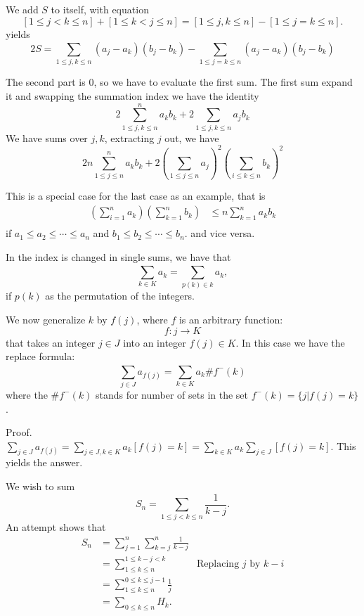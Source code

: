 We add $S$ to itself, with equation
\[
    [1\leq j<k\leq n]+[1\leq k<j\leq n]=[1\leq j,k\leq n]-[1\leq j=k\leq n].
\]
yields 
\[
    2S=\sum_{1\leq j,k\leq n}^{}(a_j-a_k)(b_j-b_k) - \sum_{1\leq j=k\leq n}^{} (a_j-a_k)(b_j-b_k)
\]

The second part is 0, so we have to evaluate the first sum.
The first sum expand it and swapping the summation index
we have the identity 
\[
    2 \sum_{1\leq j,k\leq n}^{n}a_kb_k + 2 \sum_{1\leq j,k\leq n}^{} a_jb_k
\]
We have sums over $j,k$, extracting $j$ out, we have 
\[
    2n \sum_{1\leq j\leq n}^{n}a_kb_k + 2 \left(\sum_{1\leq j\leq n}^{} a_j  \right)^2 \left( \sum_{i\leq k\leq n}^{} b_k\right)^2
\]

 This is a special case for the 
last case as an example, that is 
\begin{align*}
    \left( \sum_{i=1}^{n} a_k \right) \left( \sum_{k=1}^{n} b_k \right) 
    &\leq n \sum_{k=1}^{n} a_k b_k \\
\end{align*}
if $a_1\leq a_2\leq \cdots\leq a_n$ and $b_1\leq b_2\leq \cdots\leq b_n$. 
and vice versa. 

 In the index is changed in 
single sums, we have that 
\[
    \sum_{k \in K}^{}a_k = \sum_{p(k) \in k}^{} a_k,
\]
if $p(k)$ as the permutation of the integers. 

We now generalize $k$ by $f(j)$, where $f$ is an arbitrary function: 
\[
    f:j\to K
\]
that takes an integer $j \in J$ into an integer $f(j) \in K$. In this case
we have the replace formula:
\[
    \sum_{j \in J}^{}a_{f(j)} = \sum_{k \in K }^{} a_k \#f^-(k)
\]
where the $\#f^-(k)$ stands for number of sets in the set $f^-(k)=\{ j|f(j)=k \}$. 

Proof. $\sum_{j \in J}^{}a_{f(j)} = \sum_{j \in J, k \in K}^{}a_k[f(j)=k]=
\sum_{k \in K}^{}a_k \sum_{j \in J}^{}[f(j)=k]$. This yields the answer. 

 We wish to sum 
\[
    S_n = \sum_{1\leq j<k\leq n}^{}\frac{1}{k-j}. 
\]
An attempt shows that 
\begin{align*}
    S_n &= \sum_{j=1}^{n} \sum_{k=j}^{n}\frac{1}{k-j} \\
        &=  \sum_{1\leq k\leq n}^{1\leq k-j<k} &\text{Replacing $j$ by $k-i$} \\
        &= \sum_{1\leq k\leq n}^{0\leq k\leq j-1} \frac{1}{j}\\
        &= \sum_{0\leq k\leq n}^{}H_k.
\end{align*}


